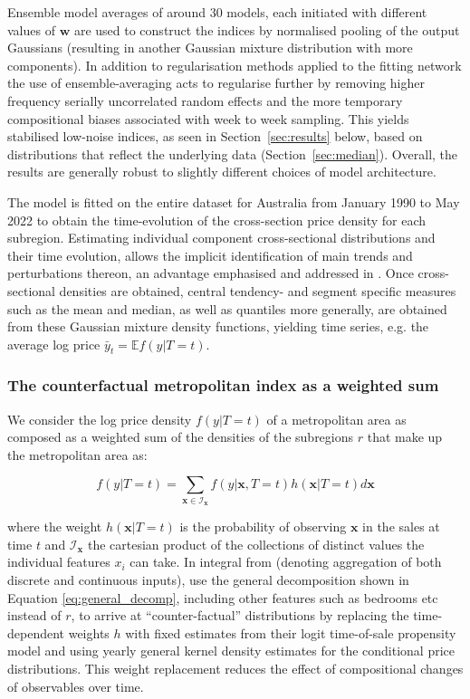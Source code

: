 Ensemble model averages of around 30 models, each initiated with different values of $\mathbf{w}$ are used to construct the indices by normalised pooling of the output Gaussians (resulting in another Gaussian mixture distribution with more components). In addition to regularisation methods applied to the fitting network the use of ensemble-averaging acts to regularise further by removing higher frequency serially uncorrelated random effects and the more temporary compositional biases associated with week to week sampling. This yields stabilised low-noise indices, as seen in Section~\ref{sec:results} below, based on distributions that reflect the underlying data (Section~\ref{sec:median}). Overall, the results are generally robust to slightly different choices of model architecture.  

The model is fitted on the entire dataset for Australia from January 1990 to May 2022 to obtain the time-evolution of the cross-section price density for each subregion.  Estimating individual component cross-sectional distributions and their time evolution, allows the implicit identification of main trends and perturbations thereon, an advantage emphasised and addressed in \citet{francke_minne2017, ren_et_al2017}. Once cross-sectional densities are obtained, central tendency- and segment specific measures such as the mean and median, as well as quantiles more generally, are obtained from these Gaussian mixture density functions, yielding time series, e.g. the average log price $\bar{y}_t = \mathbb{E}f(y \vert T = t)$. 


\subsubsection{The counterfactual metropolitan index as a weighted sum}

We consider the log price density $f(y \vert T = t)$ of a metropolitan area as composed as a weighted sum of the densities of the subregions $r$ that make up the metropolitan area as:

\begin{equation} \label{eq:general_decomp}
	f(y \vert T = t) = \sum_{\mathbf{x} \in \mathcal{I}_\mathbf{x}} f(y \vert \mathbf{x}, T = t) h(\mathbf{x} \vert T = t)d\mathbf{x}	
\end{equation}

 where the weight $h(\mathbf{x} \vert T = t)$ is the probability of observing $\mathbf{x}$ in the sales at time $t$ and $\mathcal{I}_\mathbf{x}$ the cartesian product of the collections of distinct values the individual features $x_i$ can take. 
In integral from (denoting aggregation of both discrete and continuous inputs), \citet{mcmillen_shimizu2021} use the general decomposition shown in Equation \ref{eq:general_decomp}, including other features such as bedrooms etc instead of $r$, to arrive at ``counter-factual'' distributions by replacing the time-dependent weights $h$ with fixed estimates from their logit time-of-sale propensity model and using yearly general kernel density estimates for the conditional price distributions. This weight replacement reduces the effect of compositional changes of observables over time. 


